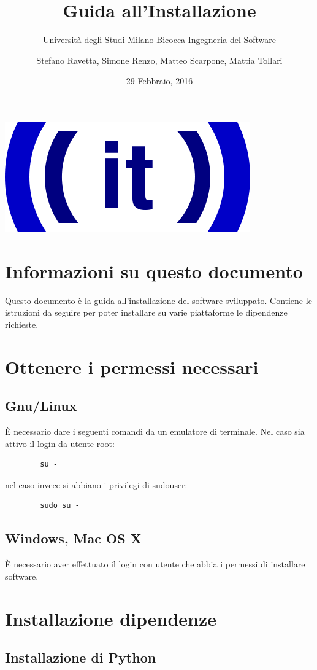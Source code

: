 \documentclass[12pt]{scrartcl}
\title{Guida all'Installazione}
\subtitle{Universit\`a degli Studi Milano Bicocca Ingegneria del Software}
\author{Stefano Ravetta, Simone Renzo, Matteo Scarpone, Mattia Tollari}
\date{29 Febbraio, 2016}
\begin{document}
\maketitle
\centerline{\includegraphics[scale=0.5]{ITicon.png}}
\tableofcontents
\section{Informazioni su questo documento}
    Questo documento \`e la guida all'installazione del software sviluppato.
    Contiene le istruzioni da seguire per poter installare su varie piattaforme
    le dipendenze richieste.
\section{Ottenere i permessi necessari}
    \subsection{Gnu/Linux}
        \`E necessario dare i seguenti comandi da un emulatore di terminale.
        Nel caso sia attivo il login da utente root:
        \begin{verbatim}
        su -
        \end{verbatim}
        nel caso invece si abbiano i privilegi di sudouser:
        \begin{verbatim}
        sudo su -
        \end{verbatim}
    \subsection{Windows, Mac OS X}
        \`E necessario aver effettuato il login con utente che abbia i permessi
        di installare software.
\section{Installazione dipendenze}
\subsection{Installazione di Python}
    
\end{document}

